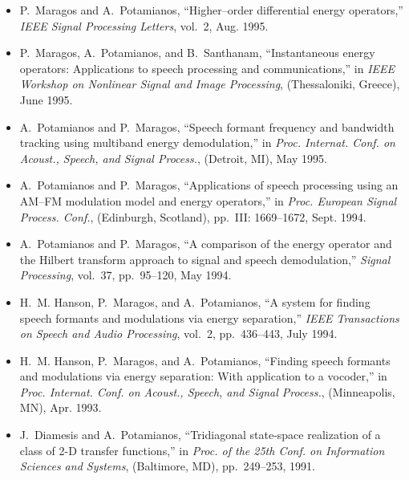 \begin{itemize}
\item
P.~Maragos and A.~Potamianos, ``Higher--order differential energy operators,''
  {\em IEEE Signal Processing Letters}, vol.~2, Aug. 1995.

\item
P.~Maragos, A.~Potamianos, and B.~Santhanam, ``Instantaneous energy operators:
  Applications to speech processing and communications,'' in {\em IEEE Workshop
  on Nonlinear Signal and Image Processing}, (Thessaloniki, Greece), June 1995.

\item
A.~Potamianos and P.~Maragos, ``Speech formant frequency and bandwidth tracking
  using multiband energy demodulation,'' in {\em Proc. Internat. Conf. on
  Acoust., Speech, and Signal Process.}, (Detroit, MI), May 1995.

\item
A.~Potamianos and P.~Maragos, ``Applications of speech processing using an
  {AM}--{FM} modulation model and energy operators,'' in {\em Proc. European
  Signal Process. Conf.}, (Edinburgh, Scotland), pp.~III: 1669--1672, Sept.
  1994.

\item
A.~Potamianos and P.~Maragos, ``A comparison of the energy operator and the
  {H}ilbert transform approach to signal and speech demodulation,'' {\em Signal
  Processing}, vol.~37, pp.~95--120, May 1994.

\item
H.~M. Hanson, P.~Maragos, and A.~Potamianos, ``A system for finding speech
  formants and modulations via energy separation,'' {\em IEEE Transactions on
  Speech and Audio Processing}, vol.~2, pp.~436--443, July 1994.

\item
H.~M. Hanson, P.~Maragos, and A.~Potamianos, ``Finding speech formants and
  modulations via energy separation: With application to a vocoder,'' in {\em
  Proc. Internat. Conf. on Acoust., Speech, and Signal Process.}, (Minneapolis,
  MN), Apr. 1993.

\item
J.~Diamesis and A.~Potamianos, ``Tridiagonal state-space realization of a class
  of 2-{D} transfer functions,'' in {\em Proc. of the 25th Conf. on Information
  Sciences and Systems}, (Baltimore, MD), pp.~249--253, 1991.

\end{itemize}



